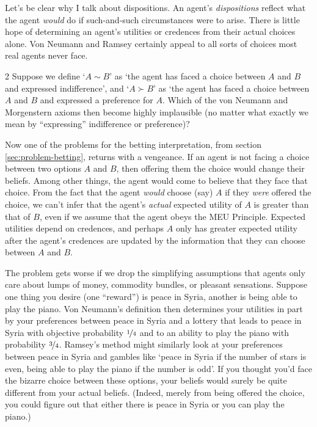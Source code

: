 Let's be clear why I talk about dispositions. An agent's \emph{dispositions}
reflect what the agent \emph{would} do if such-and-such circumstances were to
arise. There is little hope of determining an agent's utilities or credences
from their actual choices alone. Von Neumann and Ramsey certainly appeal to all
sorts of choices most real agents never face.

\begin{exercise}{2}
  Suppose we define `$A \sim B$' as `the agent has faced a choice between $A$
  and $B$ and expressed indifference', and `$A \succ B$' as `the agent has faced
  a choice between $A$ and $B$ and expressed a preference for $A$. Which of the
  von Neumann and Morgenstern axioms then become highly implausible (no matter
  what exactly we mean by ``expressing'' indifference or preference)?
\end{exercise}

Now one of the problems for the betting interpretation, from section
\ref{sec:problem-betting}, returns with a vengeance. If an agent is not facing a
choice between two options $A$ and $B$, then offering them the choice would
change their beliefs. Among other things, the agent would come to believe that they
face that choice. From the fact that the agent \emph{would} choose (say) $A$ if
they \emph{were} offered the choice, we can't infer that the agent's
\emph{actual} expected utility of $A$ is greater than that of $B$, even if we
assume that the agent obeys the MEU Principle. Expected utilities depend on
credences, and perhaps $A$ only has greater expected utility after the agent's
credences are updated by the information that they can choose between $A$ and
$B$.


The problem gets worse if we drop the simplifying assumptions that agents only
care about lumps of money, commodity bundles, or pleasant sensations. Suppose
one thing you desire (one ``reward'') is peace in Syria, another is being able
to play the piano. Von Neumann's definition then determines your utilities in
part by your preferences between peace in Syria and a lottery that leads to
peace in Syria with objective probability $\nicefrac{1}{4}$ and to an ability to
play the piano with probability $\nicefrac{3}{4}$. Ramsey's method might
similarly look at your preferences between peace in Syria and gambles like
`peace in Syria if the number of stars is even, being able to play the piano if
the number is odd'. If you thought you'd face the bizarre choice between these options, your beliefs
would surely be quite different from your actual beliefs. (Indeed, merely from
being offered the choice, you could figure out that either there is peace
in Syria or you can play the piano.)

